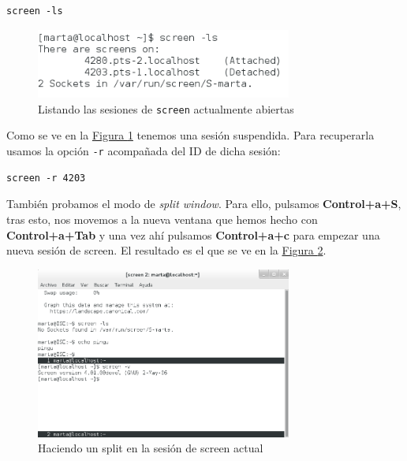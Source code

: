 \documentclass[10pt,a4paper,spanish]{article}
\numberwithin{equation}{section} %
\numberwithin{figure}{section} %
\numberwithin{table}{section} %
\begin{document}
\begin{verbatim}
screen -ls
\end{verbatim}

\begin{figure}[!h]
\centering
\includegraphics[width=0.75\textwidth]{51}
\caption{Listando las sesiones de \texttt{screen} actualmente abiertas}
\label{screenlist}
\end{figure}

Como se ve en la \hyperref[screenlist]{Figura \ref*{screenlist}} tenemos una sesión suspendida. Para recuperarla usamos la opción \texttt{-r} acompañada del ID de dicha sesión:

\begin{verbatim}
screen -r 4203 
\end{verbatim}

También probamos el modo de \textit{split window}. Para ello, pulsamos \textbf{Control+a+S}, tras esto, nos movemos a la nueva ventana que hemos hecho con \textbf{Control+a+Tab} y una vez ahí pulsamos \textbf{Control+a+c} para empezar una nueva sesión de screen. El resultado es el que se ve en la \hyperref[split]{Figura \ref*{split}}. 

\begin{figure}[!h]
\centering
\includegraphics[width=0.75\textwidth]{17}
\caption{Haciendo un split en la sesión de screen actual}
\label{split}
\end{figure}
\end{document}
